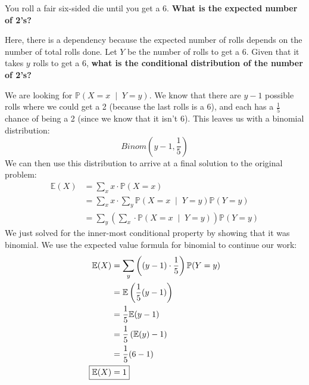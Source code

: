 \documentclass[titlepage, 12pt, leqno]{article}
\begin{document}
\begin{ex}
    You roll a fair six-sided die until you get a 6. \textbf{What is the expected number
    of 2's?}
    \vspace{10px}
    
    Here, there is a dependency because the expected number of rolls depends on the 
    number of total rolls done. Let $Y$ be the number of rolls to get a 6. Given that it 
    takes $y$ rolls to get a 6, \textbf{what is the conditional distribution of the
    number of 2's?}
    \vspace{10px}
    
    We are looking for $ \mathbb{P}\left(X=x \;\middle|\; Y=y\right)$. We know that there
    are $y-1$ possible rolls where we could get a 2 (because the last rolls is a 6), and
    each has a $\frac{1}{5}$ chance of being a 2 (since we know that it isn't 6). This
    leaves us with a binomial distribution:
    \[
        \boxed{Binom\left(y-1, \frac{1}{5}\right)}
    \]
    We can then use this distribution to arrive at a final solution to the original 
    problem:
    \begin{align*}
        \mathbb{E}(X) &= \sum_{x}x\cdot \mathbb{P}(X=x) \\
                      &=\sum_{x}x \cdot\sum_{y}\mathbb{P}
                      \left(X=x\;\middle|\;Y=y\right)\mathbb{P}(Y=y) \\
                      &= \sum_{y}\left(\sum_{x}\cdot
                          \mathbb{P}\left(X=x \;\middle|\; Y=y\right) \right)
                          \mathbb{P}(Y=y)
    \end{align*}
    We just solved for the inner-most conditional property by showing that it was
    binomial. We use the expected value formula for binomial to continue our work:
    \begin{align*}
        \mathbb{E}(X) &= \sum_{y}\left((y-1)\cdot\frac{1}{5}\right)\mathbb{P}(Y=y) \\
                      &= \mathbb{E}\left(\frac{1}{5}(y-1)\right) \\
                      &= \frac{1}{5} \mathbb{E}(y-1) \\
                      &= \frac{1}{5}\left( \mathbb{E}(y)-1\right) \\
                      &= \frac{1}{5}(6-1) \\
        \Aboxed{ \mathbb{E}(X) &= 1} 
    \end{align*}
\end{ex}
\end{document}
